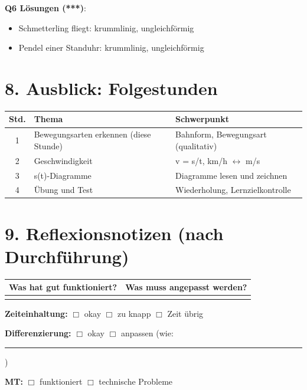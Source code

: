 \documentclass[11pt, a4paper]{article}
\begin{document}
\textbf{Q6 Lösungen (***)}:
\begin{itemize}[itemsep=1pt]
    \item Schmetterling fliegt: krummlinig, ungleichförmig
    \item Pendel einer Standuhr: krummlinig, ungleichförmig
\end{itemize}


\section*{8. Ausblick: Folgestunden}

\begin{tabular}{|c|l|l|}
\hline
\textbf{Std.} & \textbf{Thema} & \textbf{Schwerpunkt} \\
\hline
1 & Bewegungsarten erkennen (diese Stunde) & Bahnform, Bewegungsart (qualitativ) \\
\hline
2 & Geschwindigkeit & v = s/t, km/h $\leftrightarrow$ m/s \\
\hline
3 & s(t)-Diagramme & Diagramme lesen und zeichnen \\
\hline
4 & Übung und Test & Wiederholung, Lernzielkontrolle \\
\hline
\end{tabular}


\section*{9. Reflexionsnotizen (nach Durchführung)}

\begin{tabular}{|p{7cm}|p{7cm}|}
\hline
\textbf{Was hat gut funktioniert?} & \textbf{Was muss angepasst werden?} \\
\hline
& \\[2.5cm]
\hline
\end{tabular}

\vspace{0.5em}

\textbf{Zeiteinhaltung:} $\Box$ okay \quad $\Box$ zu knapp \quad $\Box$ Zeit übrig

\textbf{Differenzierung:} $\Box$ okay \quad $\Box$ anpassen (wie: \rule{4cm}{0.4pt})

\textbf{MT:} $\Box$ funktioniert \quad $\Box$ technische Probleme
\end{document}
